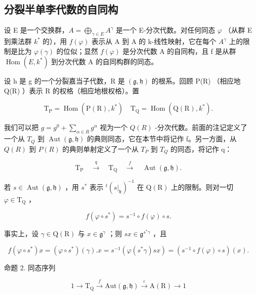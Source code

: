 \subsection{分裂半单李代数的自同构}

设 E 是一个交换群，\(A = \bigoplus_{\gamma \in E} A^{\gamma}\) 是一个 E-分次代数。对任何同态 \(\varphi\) （从群 E 到乘法群 \(k^{*}\) 的），用 \(f(\varphi)\) 表示从 A 到 A 的 k-线性映射，它在每个 \(A^{\gamma}\) 上的限制是比为 \(\varphi(\gamma)\) 的位似；显然 \(f(\varphi)\) 是分次代数 A 的自同构，且 f 是从群 \(\operatorname{Hom}(E, k^{*})\) 到分次代数 A 的自同构群的同态。

设 h 是 g 的一个分裂嘉当子代数，R 是 \((\mathfrak{g}, \mathfrak{h})\) 的根系。回顾 P(R) （相应地 Q(R) ）表示 R 的权格（相应地根权格）。置

\[
\mathrm{T} _ {\mathrm{P}} = \operatorname{Hom} (\mathrm{P} (\mathrm{R}), k ^ {*}) \quad \mathrm{T} _ {\mathrm{Q}} = \operatorname{Hom} (\mathrm{Q} (\mathrm{R}), k ^ {*}).
\]

我们可以把 \(g = g^{0} + \sum_{\alpha \in R} g^{\alpha}\) 视为一个 \(Q(R)\) -分次代数。前面的注记定义了一个从 \(T_{Q}\) 到 \(\operatorname{Aut}(\mathfrak{g}, \mathfrak{h})\) 的典则同态，它在本节中将记作 f。另一方面，从 \(Q(R)\) 到 \(P(R)\) 的典则单射定义了一个从 \(T_{P}\) 到 \(T_{Q}\) 的同态，将记作 q：

\[
\mathrm{T} _ {\mathrm{P}} \quad \stackrel {{q}} {{\longrightarrow}} \quad \mathrm{T} _ {\mathrm{Q}} \quad \stackrel {{f}} {{\longrightarrow}} \quad \operatorname{Aut} (\mathfrak {g}, \mathfrak {h}).
\]

若 \(s \in \operatorname{Aut}(\mathfrak{g}, \mathfrak{h})\) ，用 \(s^*\) 表示 \({}^t(s|_{\mathfrak{h}})^{-1}\) 在 \(\mathrm{Q}(\mathrm{R})\) 上的限制。则对一切 \(\varphi \in \mathrm{T}_{\mathrm{Q}}\) ，

\[
f (\varphi \circ s ^ {*}) = s ^ {- 1} \circ f (\varphi) \circ s.\tag{1}
\]

事实上，设 \(\gamma \in \mathrm{Q}(\mathrm{R})\) 与 \(x\in \mathfrak{g}^{\gamma}\) ；则 \(sx\in \mathfrak{g}^{s^{*}\gamma}\) ，且

\[
f (\varphi \circ s ^ {*}) x = (\varphi \circ s ^ {*}) (\gamma). x = s ^ {- 1} (\varphi (s ^ {*} \gamma) s x) = (s ^ {- 1} \circ f (\varphi) \circ s) (x).
\]

命题 2. 同态序列

\[
1 \longrightarrow \mathrm {T_ {Q}} \stackrel {f} {\longrightarrow} \mathrm{Aut} (\mathfrak {g}, \mathfrak {h}) \stackrel {\varepsilon} {\longrightarrow} \mathrm{A(R)} \longrightarrow 1
\]

